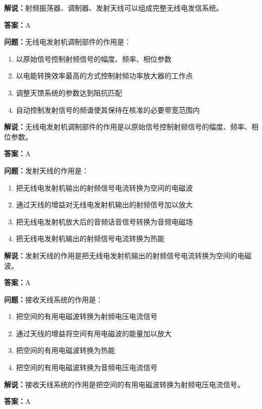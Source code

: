 \textbf{解说：}射频振荡器、调制器、发射天线可以组成完整无线电发信系统。%

\textbf{答案：}A

\textbf{问题：}无线电发射机调制部件的作用是：

\begin{enumerate}[label=\Alph*), leftmargin=3em]
	\item 以原始信号控制射频信号的幅度、频率、相位参数
	\item 以电能转换效率最高的方式控制射频功率放大器的工作点
	\item 调整天馈系统的参数达到阻抗匹配
	\item 自动控制发射信号的频谱使其保持在核准的必要带宽范围内
\end{enumerate}

\textbf{解说：}无线电发射机调制部件的作用是以原始信号控制射频信号的幅度、频率、相位参数。%

\textbf{答案：}A

\textbf{问题：}发射天线的作用是：

\begin{enumerate}[label=\Alph*), leftmargin=3em]
	\item 把无线电发射机输出的射频信号电流转换为空间的电磁波
	\item 通过天线的增益对无线电发射机输出的射频信号加以放大
	\item 把无线电发射机放大后的音频话音信号转换为音频电磁场
	\item 把无线电发射机输出的射频信号电流转换为热能
\end{enumerate}

\textbf{解说：}发射天线的作用是把无线电发射机输出的射频信号电流转换为空间的电磁波。%

\textbf{答案：}A

\textbf{问题：}接收天线系统的作用是：

\begin{enumerate}[label=\Alph*), leftmargin=3em]
	\item 把空间的有用电磁波转换为射频电压电流信号
	\item 通过天线的增益将空间有用电磁波的能量加以放大
	\item 把空间的有用电磁波转换为热能
	\item 把空间的有用电磁波转换为音频电压电流信号
\end{enumerate}

\textbf{解说：}接收天线系统的作用是把空间的有用电磁波转换为射频电压电流信号。%

\textbf{答案：}A

